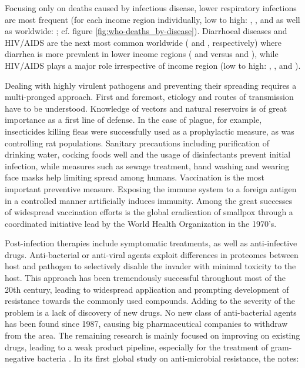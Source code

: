 

Focusing only on deaths caused by infectious disease, lower respiratory infections are most frequent (for each income region individually, low to high: \knitrPercentageInfectTwelveLowLRI{}, \knitrPercentageInfectTwelveLmidLRI{}, \knitrPercentageInfectTwelveUmidLRI{} and \knitrPercentageInfectTwelveHighLRI{} as well as worldwide: \knitrPercentageInfectTwelveWorldLRI{}; cf. figure \ref{fig:who-deaths_by-disease}). Diarrhoeal diseases and HIV\slash AIDS are the next most common worldwide (\knitrPercentageInfectTwelveWorldDiarr{} and \knitrPercentageInfectTwelveWorldAIDS{}, respectively) where diarrhea is more prevalent in lower income regions (\knitrPercentageInfectTwelveLowDiarr{} and \knitrPercentageInfectTwelveLmidDiarr{} versus \knitrPercentageInfectTwelveUmidDiarr{} and \knitrPercentageInfectTwelveHighDiarr{}), while HIV\slash AIDS plays a major role irrespective of income region (low to high: \knitrPercentageInfectTwelveLowAIDS{}, \knitrPercentageInfectTwelveLmidAIDS{}, \knitrPercentageInfectTwelveUmidAIDS{} and \knitrPercentageInfectTwelveHighAIDS{}).

Dealing with highly virulent pathogens and preventing their spreading requires a multi-pronged approach. First and foremost, etiology and routes of transmission have to be understood. Knowledge of vectors and natural reservoirs is of great importance as a first line of defense. In the case of plague, for example, insecticides killing fleas were successfully used as a prophylactic measure, as was controlling rat populations. Sanitary precautions including purification of drinking water, cocking foods well and the usage of disinfectants prevent initial infection, while measures such as sewage treatment, hand washing and wearing face masks help limiting spread among humans. Vaccination is the most important preventive measure. Exposing the immune system to a foreign antigen in a controlled manner artificially induces immunity. Among the great successes of widespread vaccination efforts is the global eradication of smallpox through a coordinated initiative lead by the World Health Organization in the 1970's.

Post-infection therapies include symptomatic treatments, as well as anti-in\-fec\-tive drugs. Anti-bacterial or anti-viral agents exploit differences in proteomes between host and pathogen to selectively disable the invader with minimal toxicity to the host. This approach has been tremendously successful throughout most of the 20th century, leading to widespread application and prompting development of resistance towards the commonly used compounds. Adding to the severity of the problem is a lack of discovery of new drugs. No new class of anti-bacterial agents has been found since 1987, causing big pharmaceutical companies to withdraw from the area. The remaining research is mainly focused on improving on existing drugs, leading to a weak product pipeline, especially for the treatment of gram-negative bacteria \citep{Silver2011}. In its first global study on anti-microbial resistance, the \cite{WHO2014} notes:

